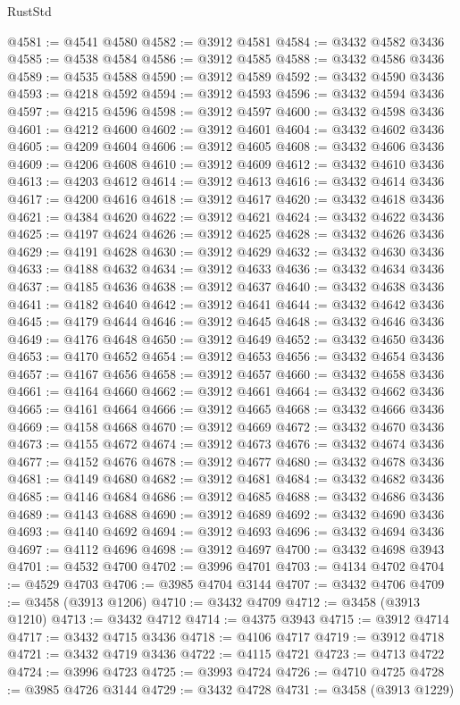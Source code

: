 \begin{lexlean}{RustStd}
\begin{coremodule}
@4581 := @4541 @4580
@4582 := @3912 @4581
@4584 := @3432 @4582 @3436
@4585 := @4538 @4584
@4586 := @3912 @4585
@4588 := @3432 @4586 @3436
@4589 := @4535 @4588
@4590 := @3912 @4589
@4592 := @3432 @4590 @3436
@4593 := @4218 @4592
@4594 := @3912 @4593
@4596 := @3432 @4594 @3436
@4597 := @4215 @4596
@4598 := @3912 @4597
@4600 := @3432 @4598 @3436
@4601 := @4212 @4600
@4602 := @3912 @4601
@4604 := @3432 @4602 @3436
@4605 := @4209 @4604
@4606 := @3912 @4605
@4608 := @3432 @4606 @3436
@4609 := @4206 @4608
@4610 := @3912 @4609
@4612 := @3432 @4610 @3436
@4613 := @4203 @4612
@4614 := @3912 @4613
@4616 := @3432 @4614 @3436
@4617 := @4200 @4616
@4618 := @3912 @4617
@4620 := @3432 @4618 @3436
@4621 := @4384 @4620
@4622 := @3912 @4621
@4624 := @3432 @4622 @3436
@4625 := @4197 @4624
@4626 := @3912 @4625
@4628 := @3432 @4626 @3436
@4629 := @4191 @4628
@4630 := @3912 @4629
@4632 := @3432 @4630 @3436
@4633 := @4188 @4632
@4634 := @3912 @4633
@4636 := @3432 @4634 @3436
@4637 := @4185 @4636
@4638 := @3912 @4637
@4640 := @3432 @4638 @3436
@4641 := @4182 @4640
@4642 := @3912 @4641
@4644 := @3432 @4642 @3436
@4645 := @4179 @4644
@4646 := @3912 @4645
@4648 := @3432 @4646 @3436
@4649 := @4176 @4648
@4650 := @3912 @4649
@4652 := @3432 @4650 @3436
@4653 := @4170 @4652
@4654 := @3912 @4653
@4656 := @3432 @4654 @3436
@4657 := @4167 @4656
@4658 := @3912 @4657
@4660 := @3432 @4658 @3436
@4661 := @4164 @4660
@4662 := @3912 @4661
@4664 := @3432 @4662 @3436
@4665 := @4161 @4664
@4666 := @3912 @4665
@4668 := @3432 @4666 @3436
@4669 := @4158 @4668
@4670 := @3912 @4669
@4672 := @3432 @4670 @3436
@4673 := @4155 @4672
@4674 := @3912 @4673
@4676 := @3432 @4674 @3436
@4677 := @4152 @4676
@4678 := @3912 @4677
@4680 := @3432 @4678 @3436
@4681 := @4149 @4680
@4682 := @3912 @4681
@4684 := @3432 @4682 @3436
@4685 := @4146 @4684
@4686 := @3912 @4685
@4688 := @3432 @4686 @3436
@4689 := @4143 @4688
@4690 := @3912 @4689
@4692 := @3432 @4690 @3436
@4693 := @4140 @4692
@4694 := @3912 @4693
@4696 := @3432 @4694 @3436
@4697 := @4112 @4696
@4698 := @3912 @4697
@4700 := @3432 @4698 @3943
@4701 := @4532 @4700
@4702 := @3996 @4701
@4703 := @4134 @4702
@4704 := @4529 @4703
@4706 := @3985 @4704 @3144
@4707 := @3432 @4706
@4709 := @3458 (@3913 @1206)
@4710 := @3432 @4709
@4712 := @3458 (@3913 @1210)
@4713 := @3432 @4712
@4714 := @4375 @3943
@4715 := @3912 @4714
@4717 := @3432 @4715 @3436
@4718 := @4106 @4717
@4719 := @3912 @4718
@4721 := @3432 @4719 @3436
@4722 := @4115 @4721
@4723 := @4713 @4722
@4724 := @3996 @4723
@4725 := @3993 @4724
@4726 := @4710 @4725
@4728 := @3985 @4726 @3144
@4729 := @3432 @4728
@4731 := @3458 (@3913 @1229)

\end{coremodule}
\end{lexlean}
